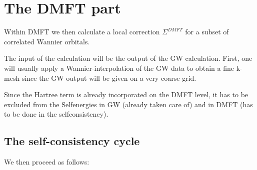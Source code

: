 \documentclass[12pt,a4paper]{scrartcl}
\numberwithin{equation}{section}
\begin{document}
\section{The DMFT part}

Within DMFT we then calculate a local correction $\Sigma^{DMFT}$ for a subset of correlated
Wannier orbitals.

The input of the calculation will be the output of the GW calculation. First, one will usually apply a Wannier-interpolation of the GW data to obtain a fine k-mesh
since the GW output will be given on a very coarse grid.

Since the Hartree term is already incorporated on the DMFT level, 
it has to be excluded from the Selfenergies in GW (already taken care of)
and in DMFT (has to be done in the selfconsistency).

\subsection{The self-consistency cycle}

We then proceed as follows:
\end{document}

